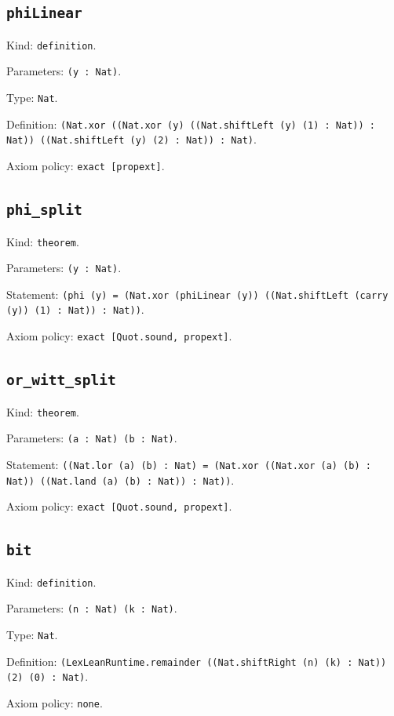 \documentclass[11pt]{article}
\begin{document}
\subsection*{\texttt{phiLinear}}
\noindent Kind: \texttt{definition}.\par
\noindent Parameters: \texttt{(y : Nat)}.\par
\noindent Type: \texttt{Nat}.\par
\noindent Definition: \texttt{(Nat.xor ((Nat.xor (y) ((Nat.shiftLeft (y) (1) : Nat)) : Nat)) ((Nat.shiftLeft (y) (2) : Nat)) : Nat)}.\par
\noindent Axiom policy: \texttt{exact [propext]}.\par
\subsection*{\texttt{phi\_split}}
\noindent Kind: \texttt{theorem}.\par
\noindent Parameters: \texttt{(y : Nat)}.\par
\noindent Statement: \texttt{(phi (y) = (Nat.xor (phiLinear (y)) ((Nat.shiftLeft (carry (y)) (1) : Nat)) : Nat))}.\par
\noindent Axiom policy: \texttt{exact [Quot.sound, propext]}.\par
\subsection*{\texttt{or\_witt\_split}}
\noindent Kind: \texttt{theorem}.\par
\noindent Parameters: \texttt{(a : Nat) (b : Nat)}.\par
\noindent Statement: \texttt{((Nat.lor (a) (b) : Nat) = (Nat.xor ((Nat.xor (a) (b) : Nat)) ((Nat.land (a) (b) : Nat)) : Nat))}.\par
\noindent Axiom policy: \texttt{exact [Quot.sound, propext]}.\par
\subsection*{\texttt{bit}}
\noindent Kind: \texttt{definition}.\par
\noindent Parameters: \texttt{(n : Nat) (k : Nat)}.\par
\noindent Type: \texttt{Nat}.\par
\noindent Definition: \texttt{(LexLeanRuntime.remainder ((Nat.shiftRight (n) (k) : Nat)) (2) (0) : Nat)}.\par
\noindent Axiom policy: \texttt{none}.\par
\end{document}
